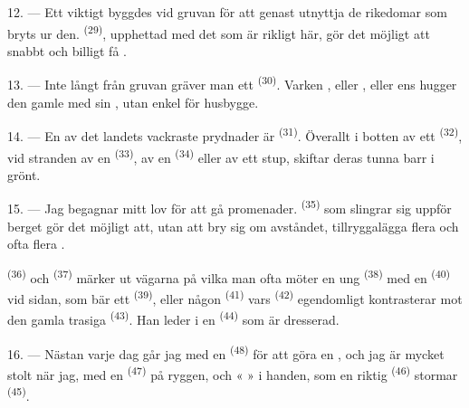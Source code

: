 12. --- Ett viktigt  byggdes vid gruvan för att genast utnyttja
de rikedomar som bryts ur den.  \textsuperscript{(29)}, upphettad
med det  som är rikligt här, gör det möjligt att snabbt och
billigt få .

13. --- Inte långt från gruvan gräver man ett 
\textsuperscript{(30)}. Varken , eller , eller ens
 hugger den gamle  med sin ,
utan enkel  för husbygge.

14. --- En av det landets vackraste prydnader är 
\textsuperscript{(31)}. Överallt i botten av ett 
\textsuperscript{(32)}, vid stranden av en  \textsuperscript{(33)},
av en  \textsuperscript{(34)} eller av ett stup, skiftar deras
tunna barr i grönt.

\VUsaut{3.0mm}
\VUsaut{3.0mm}

15. --- Jag begagnar mitt lov för att gå  promenader.
 \textsuperscript{(35)} som slingrar sig uppför berget gör det
möjligt att, utan att bry sig om avståndet, tillryggalägga flera
 och ofta flera .

 \textsuperscript{(36)} och 
\textsuperscript{(37)} märker ut vägarna på vilka man ofta möter en ung
 \textsuperscript{(38)} med en 
\textsuperscript{(40)} vid sidan, som bär ett 
\textsuperscript{(39)}, eller någon  \textsuperscript{(41)}
vars  \textsuperscript{(42)} egendomligt kontrasterar mot den
gamla trasiga  \textsuperscript{(43)}. Han leder i en
 \textsuperscript{(44)} som är dresserad.

\VUsaut{3.0mm}

16. --- Nästan varje dag går jag med en  \textsuperscript{(48)}
för att göra en , och jag är mycket stolt när jag, med en
 \textsuperscript{(47)} på ryggen, och «  » i
handen, som en riktig  \textsuperscript{(46)} stormar
 \textsuperscript{(45)}.


